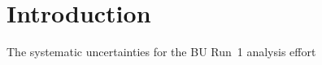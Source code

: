
\graphicspath{}

\section{Introduction}


The systematic uncertainties for the BU Run~1 \wa analysis effort 











